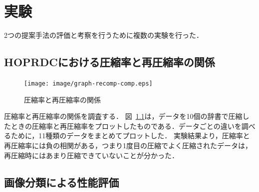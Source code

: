 \chapter{実験}
2つの提案手法の評価と考察を行うために複数の実験を行った．

\section{HOPRDCにおける圧縮率と再圧縮率の関係} %
\label{sec:hoprdcにおける圧縮率と再圧縮率の関係}
\begin{figure}[tb]
\begin{center}
\texttt{[image: image/graph-recomp-comp.eps]}
\caption{圧縮率と再圧縮率の関係}
\label{fig:image/graph-recomp-comp}
\end{center}
\end{figure}

圧縮率と再圧縮率の関係を調査する．
図~\ref{fig:image/graph-recomp-comp}は，データを10個の辞書で圧縮したときの圧縮率と再圧縮率をプロットしたものである．データごとの違いを調べるために，11種類のデータをまとめてプロットした．
実験結果より，圧縮率と再圧縮率には負の相関がある，つまり1度目の圧縮でよく圧縮されたデータは，再圧縮時にはあまり圧縮できていないことが分かった．

\section{画像分類による性能評価}
